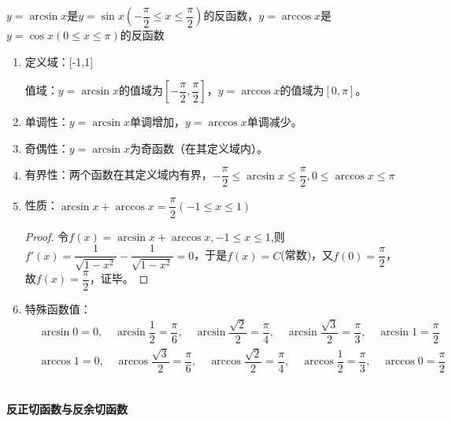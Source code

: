 $y=\arcsin x$是$y=\sin x\left(-\dfrac{\pi}{2}\leq x\leq \dfrac{\pi}{2}\right)$的反函数，$y=\arccos x$是$y=\cos x(0\leq x\leq \pi)$的反函数

\begin{note}
    \begin{enumerate}
        \item 定义域：[-1,1]

        值域：$y=\arcsin x$的值域为$\left[-\dfrac{\pi}{2},\dfrac{\pi}{2}\right]$，$y=\arccos x$的值域为$[0,\pi]$。

        \item 单调性：$y=\arcsin x$单调增加，$y=\arccos x$单调减少。

        \item 奇偶性：$y=\arcsin x$为奇函数（在其定义域内）。

        \item 有界性：两个函数在其定义域内有界，$-\dfrac{\pi}{2}\leq \arcsin x\leq \dfrac{\pi}{2}, 0\leq \arccos x\leq\pi$

        \item 性质：$\arcsin x+\arccos x = \dfrac{\pi}{2}(-1\leq x \leq 1)$
        \begin{proof}
            令$f(x)=\arcsin x+\arccos x,-1\leq x \leq 1$,则$f'(x)=\dfrac{1}{\sqrt{1-x^2}}-\dfrac{1}{\sqrt{1-x^2}}=0$，于是$f(x)=C$(常数)，又$f(0)=\dfrac{\pi}{2}$，故$f(x)=\dfrac{\pi}{2}$，证毕。
        \end{proof}

        \item 特殊函数值：
        \begin{equation}
        \begin{aligned}
            &
            \arcsin 0 = 0, \quad \arcsin \dfrac{1}{2} = \dfrac{\pi}{6}, \quad \arcsin \dfrac{\sqrt{2}}{2} = \dfrac{\pi}{4}, \quad \arcsin \dfrac{\sqrt{3}}{2} = \dfrac{\pi}{3}, \quad \arcsin 1 = \dfrac{\pi}{2} \\
            &
            \arccos 1 = 0, \quad \arccos \dfrac{\sqrt{3}}{2} = \dfrac{\pi}{6}, \quad \arccos \dfrac{\sqrt{2}}{2} = \dfrac{\pi}{4}, \quad \arccos \dfrac{1}{2} = \dfrac{\pi}{3}, \quad \arccos 0 = \dfrac{\pi}{2}
        \end{aligned}    \nonumber
        \end{equation}
    \end{enumerate}
\end{note}
~\\

\textbf{反正切函数与反余切函数}

